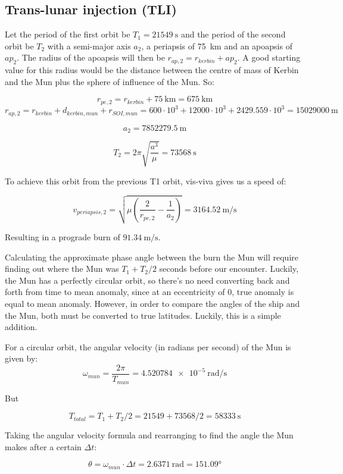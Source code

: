\documentclass[11pt, a4paper]{article}
\begin{document}
\subsection{Trans-lunar injection (TLI)}

Let the period of the first orbit be $T_1 = \qty{21549}{\second}$ and
the period of the second orbit be $T_2$ with a semi-major axis $a_2$,
a periapsis of \qty{75}{\km} and an apoapsis of $ap_2$. The radius of
the apoapsis will then be $r_{ap,2}=r_{kerbin}+ap_2$. A good starting
value for this radius would be the distance between the centre of mass
of Kerbin and the Mun plus the sphere of influence of the Mun. So:

\[ r_{pe,2} = r_{kerbin} + \qty{75}{\km} = \qty{675}{\km} \]
\[ r_{ap,2} = r_{kerbin} + d_{kerbin,mun} + r_{SOI,mun} = 600 \cdot
  10^3 + 12000 \cdot 10^3 + 2429.559 \cdot 10^3 =
  \qty{15029000}{\metre} \]

\[ a_2 = \qty{7852279.5}{\metre} \]

\[ T_2 = 2\pi\sqrt{\frac{a^3}{\mu}} = \qty{73568}{\second}\]

To achieve this orbit from the previous T1 orbit, vis-viva gives us a
speed of:

\[ v_{periapsis,2} = \sqrt{\mu (\frac{2}{r_{pe,2}} - \frac{1}{a_2}
    )} = \qty{3164.52}{\metre/\second} \]

Resulting in a prograde burn of $\qty{91.34}{\metre/\second}$.

Calculating the approximate phase angle between the burn the Mun will
require finding out where the Mun was $T_1 + T_2/2$ seconds before our
encounter. Luckily, the Mun has a perfectly circular orbit, so there's
no need converting back and forth from time to mean anomaly, since at
an eccentricity of 0, true anomaly is equal to mean anomaly. However,
in order to compare the angles of the ship and the Mun, both must be
converted to true latitudes. Luckily, this is a simple addition.

For a circular orbit, the angular velocity (in radians per second) of
the Mun is given by:
\[ \omega_{mun} = \frac{2\pi}{T_{mun}} = \qty{4.520784e-5}{\radian/\second}\]

But

\[ T_{total} = T_1 + T_2/2 = 21549 + 73568/2 = \qty{58333}{\second} \]

Taking the angular velocity formula and rearranging to find the angle
the Mun makes after a certain $\Delta t$:

\[ \theta = \omega_{mun} \cdot \Delta t = \qty{2.6371}{\radian} =
  \ang{151.09} \]
\end{document}
